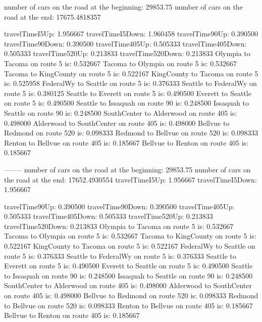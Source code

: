 number of cars on the road at the beginning:
29853.75
number of cars on the road at the end:
17675.4818357

travelTimeI5Up: 1.956667
travelTimeI5Down: 1.960458
travelTime90Up: 0.390500
travelTime90Down: 0.390500
travelTime405Up: 0.505333
travelTime405Down: 0.505333
travelTime520Up: 0.213833
travelTime520Down: 0.213833
Olympia to Tacoma on route 5 is: 0.532667
Tacoma to Olympia on route 5 is: 0.532667
Tacoma to KingCounty on route 5 is: 0.522167
KingCounty to Tacoma on route 5 is: 0.525958
FederalWy to Seattle on route 5 is: 0.376333
Seattle to FederalWy on route 5 is: 0.380125
Seattle to Everett on route 5 is: 0.490500
Everett to Seattle on route 5 is: 0.490500
Seattle to Issaquah on route 90 is: 0.248500
Issaquah to Seattle on route 90 is: 0.248500
SouthCenter to Alderwood on route 405 is: 0.498000
Alderwood to SouthCenter on route 405 is: 0.498000
Bellvue to Redmond on route 520 is: 0.098333
Redmond to Bellvue on route 520 is: 0.098333
Renton to Bellvue on route 405 is: 0.185667
Bellvue to Renton on route 405 is: 0.185667

--------
number of cars on the road at the beginning:
29853.75
number of cars on the road at the end:
17652.4930554
travelTimeI5Up: 1.956667
travelTimeI5Down: 1.956667

travelTime90Up: 0.390500
travelTime90Down: 0.390500
travelTime405Up: 0.505333
travelTime405Down: 0.505333
travelTime520Up: 0.213833
travelTime520Down: 0.213833
Olympia to Tacoma on route 5 is: 0.532667
Tacoma to Olympia on route 5 is: 0.532667
Tacoma to KingCounty on route 5 is: 0.522167
KingCounty to Tacoma on route 5 is: 0.522167
FederalWy to Seattle on route 5 is: 0.376333
Seattle to FederalWy on route 5 is: 0.376333
Seattle to Everett on route 5 is: 0.490500
Everett to Seattle on route 5 is: 0.490500
Seattle to Issaquah on route 90 is: 0.248500
Issaquah to Seattle on route 90 is: 0.248500
SouthCenter to Alderwood on route 405 is: 0.498000
Alderwood to SouthCenter on route 405 is: 0.498000
Bellvue to Redmond on route 520 is: 0.098333
Redmond to Bellvue on route 520 is: 0.098333
Renton to Bellvue on route 405 is: 0.185667
Bellvue to Renton on route 405 is: 0.185667